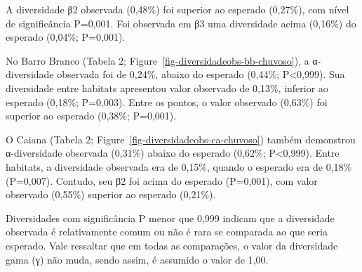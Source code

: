 \documentclass[
  letterpaper,
  DIV=11,
  numbers=noendperiod]{scrartcl}
\begin{document}
A diversidade β2 observada (0,48\%) foi superior ao esperado (0,27\%),
com nível de significância P=0,001. Foi observada em β3 uma diversidade
acima (0,16\%) do esperado (0,04\%; P=0,001).

No Barro Branco (Tabela 2; Figure~\ref{fig-diversidadeobs-bb-chuvoso}),
a α-diversidade observada foi de 0,24\%, abaixo do esperado (0,44\%;
P\textless0,999). Sua diversidade entre habitats apresentou valor
observado de 0,13\%, inferior ao esperado (0,18\%; P=0,003). Entre os
pontos, o valor observado (0,63\%) foi superior ao esperado (0,38\%;
P=0,001).

O Caiana (Tabela 2; Figure~\ref{fig-diversidadeobs-ca-chuvoso}) também
demonstrou α-diversidade observada (0,31\%) abaixo do esperado (0,62\%;
P\textless0,999). Entre habitats, a diversidade observada era de 0,15\%,
quando o esperado era de 0,18\% (P=0,007). Contudo, seu β2 foi acima do
esperado (P=0,001), com valor observado (0,55\%) superior ao esperado
(0,21\%).

Diversidades com significância P menor que 0,999 indicam que a
diversidade observada é relativamente comum ou não é rara se comparada
ao que seria esperado. Vale ressaltar que em todas as comparações, o
valor da diversidade gama (γ) não muda, sendo assim, é assumido o valor
de 1,00.
\end{document}
